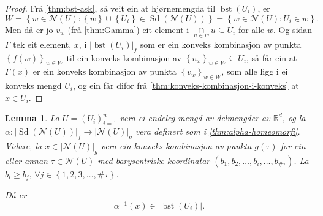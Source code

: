 \documentclass[a4paper, 12pt, norsk]{article}
\theoremstyle{plain}
\newtheorem{lemma}[theorem]{Lemma}
\theoremstyle{definition}
\newcommand{\Rb}{\mathbb{R}}
\newcommand{\Nc}{\mathcal{N}}
\newcommand{\intersect}{ \mathop{\cap}\limits }
\newcommand{\union}{ \mathop{\cup}\limits }
\newcommand{\gr}[1]{ \lvert #1 \rvert } %
\newcommand{\set}[1]{ \left\{ #1 \right\} } %
\newcommand{\tuple}[1]{ \left( #1 \right) } %
\DeclareMathOperator{\Sd}{Sd} %
\DeclareMathOperator{\bst}{bst} %
\begin{document}
\begin{proof}
	Frå \autoref{thm:bst-ask}, så veit ein at hjørnemengda til \( \bst(U_i) \), er
	\[
		W = \set{w \in \Nc(U) : \set{w} \union \set{U_i} \in \Sd(\Nc(U))}=\set{w \in \Nc(U) : U_i \in w}.
	\] 
	Men då er jo \( v_w \) (frå \autoref{thm:Gamma}) eit element i \( \intersect_{u \in w} u \subseteq U_i \) for alle \( w \). Og sidan \( \Gamma \) tek eit element, \( x \), i \( \gr{\bst(U_i)}_f \) som er ein konveks kombinasjon av punkta \( \set{f(w)}_{w \in W} \) til ein konveks kombinasjon av \( \set{v_w}_{w \in W} \subseteq U_i \), så får ein at \( \Gamma(x) \) er ein konveks kombinasjon av punkta \( \set{v_w}_{w \in W} \), som alle ligg i ei konveks mengd \( U_i \), og ein får difor frå \autoref{thm:konveks-kombinasjon-i-konveks} at \( x \in U_i \).
\end{proof}

\begin{lemma} \label{thm:bst-betingingar}
	La \( U = \tuple{U_i}_{i=1}^n \) vera ei endeleg mengd av delmengder av \( \Rb^d \), og la \( \alpha: \gr{\Sd(\Nc(U))}_f \to \gr{\Nc(U)}_g \) vera definert som i \autoref{thm:alpha-homeomorfi}. Vidare, la \( x \in \gr{\Nc(U)}_g \) vera ein konveks kombinasjon av punkta \( g(\tau) \) for ein eller annan \( \tau \in \Nc(U) \) med barysentriske koordinatar \( \tuple{b_1, b_2,\dots, b_i, \dots, b_{\#\tau}} \). La \( b_i \geq b_j, \, \forall j \in \set{1, 2, 3, \dots, \#\tau} \). 
	
	Då er
	\[ 
		\alpha^{-1}(x) \in \gr{\bst(U_i)}.
	\]
\end{lemma}
\end{document}
